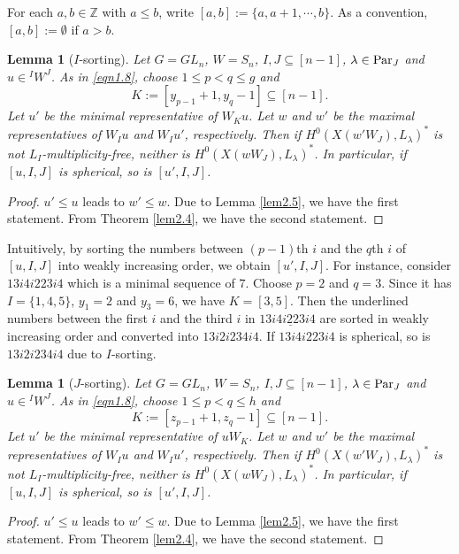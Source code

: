 \documentclass[12pt]{amsart}
\newtheorem{lemma}[theorem]{Lemma}
\theoremstyle{definition}
\theoremstyle{remark}
\newcommand{\Z}{\mathbb{Z}}
\newcommand{\Parj}{{\rm Par}_J}
\begin{document}
For each $a , b \in \Z$ with $a \leq b$, write $[a,b]:=\{ a , a+1 , \cdots , b\}$. As a convention, $[a,b] := \emptyset$ if $a>b$.

\begin{lemma}[$I$-sorting]\label{lem2.7}
Let $G = GL_n$, $W= S_n$, $I,J \subseteq [n-1]$, $\lambda \in \Parj$ and $u \in {}^I W^J$. As in \eqref{eqn1.8}, choose $1 \leq p<q \leq g$ and
\begin{equation}\label{eqn2.6}
K:= [y_{p-1}+1 , y_{q}-1]\subseteq [n-1].
\end{equation}
Let $u'$ be the minimal representative of $W_K u$. Let $w$ and $w'$ be the maximal representatives of $W_I u$ and $W_I u'$, respectively. Then if $H^0 (X(w'W_J),L_\lambda)^*$ is not $L_I$-multiplicity-free, neither is $H^0 (X(wW_J),L_\lambda)^*$. In particular, if $[u,I,J]$ is spherical, so is $[u',I,J]$.
\end{lemma}
\begin{proof}
$u' \leq u$ leads to $w' \leq w$. Due to Lemma \ref{lem2.5}, we have the first statement. From Theorem \ref{lem2.4}, we have the second statement.
\end{proof}

Intuitively, by sorting the numbers between $(p-1)$th $i$ and the $q$th $i$ of $[u,I,J]$ into weakly increasing order, we obtain $[u',I,J]$. For instance, consider $13i4i223i4$ which is a minimal sequence of $7$. Choose $p=2$ and $q=3$. Since it has $I = \{ 1,4,5\}$, $y_1 = 2$ and $y_3 = 6$, we have $K = [3,5]$. Then the underlined numbers between the first $i$ and the third $i$ in $13\underline{i4i223i}4$ are sorted in weakly increasing order and converted into $13i2i234i4$. If $13i4i223i4$ is spherical, so is $13i2i234i4$ due to $I$-sorting.

\begin{lemma}[$J$-sorting]\label{lem2.8}
Let $G = GL_n$, $W= S_n$, $I,J \subseteq [n-1]$, $\lambda \in \Parj$ and $u \in {}^I W^J$. As in \eqref{eqn1.8}, choose $1 \leq p<q \leq h$ and
\begin{equation}\label{eqn2.7}
K:= [ z_{p-1} + 1 ,  z_q - 1 ] \subseteq [n-1].
\end{equation}
Let $u'$ be the minimal representative of $uW_K$. Let $w$ and $w'$ be the maximal representatives of $W_I u$ and $W_I u'$, respectively. Then if $H^0 (X(w'W_J),L_\lambda)^*$ is not $L_I$-multiplicity-free, neither is $H^0 (X(wW_J),L_\lambda)^*$. In particular, if $[u,I,J]$ is spherical, so is $[u',I,J]$.
\end{lemma}
\begin{proof}
$u' \leq u$ leads to $w' \leq w$. Due to Lemma \ref{lem2.5}, we have the first statement. From Theorem \ref{lem2.4}, we have the second statement.
\end{proof}
\end{document}
